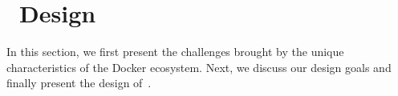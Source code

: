 \section{\sysname~Design}
\label{sec:\sysname}

%




In this section, we first present the challenges brought by the unique characteristics of the Docker ecosystem.
Next, we discuss our design goals and finally present the design of~\sysname. 







